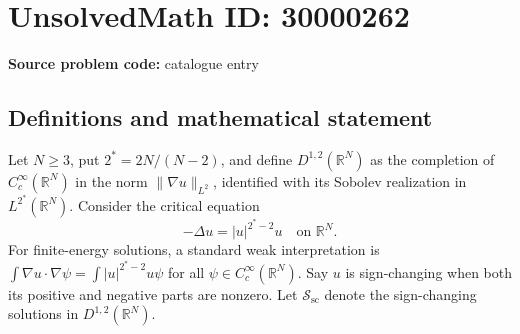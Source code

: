 \documentclass[11pt]{article}
\newcommand{\R}{\mathbb{R}}
\begin{document}
\section*{UnsolvedMath ID: 30000262}
\textbf{Source problem code:} catalogue entry
\subsection{Definitions and mathematical statement}
Let \(N\geq3\), put \(2^*=2N/(N-2)\), and define \(D^{1,2}(\R^N)\) as the completion of \(C_c^\infty(\R^N)\) in the norm \(\|\nabla u\|_{L^2}\), identified with its Sobolev realization in \(L^{2^*}(\R^N)\). Consider the critical equation
\[
 -\Delta u=|u|^{2^*-2}u\quad\text{on }\R^N.
\]
For finite-energy solutions, a standard weak interpretation is
\(\int\nabla u\cdot\nabla\psi=\int |u|^{2^*-2}u\psi\) for all \(\psi\in C_c^\infty(\R^N)\). Say \(u\) is sign-changing when both its positive and negative parts are nonzero. Let \(\mathcal S_{\mathrm{sc}}\) denote the sign-changing solutions in \(D^{1,2}(\R^N)\).
\end{document}
